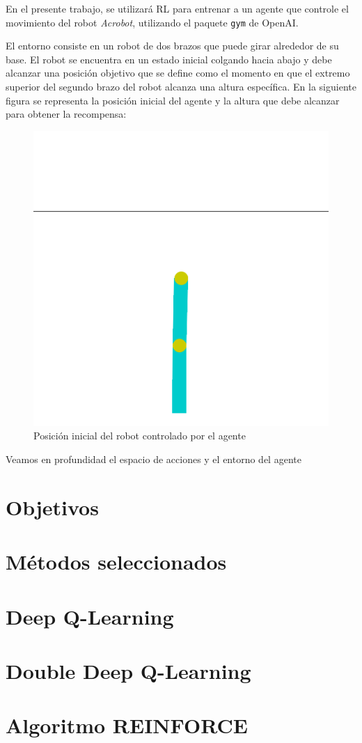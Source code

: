 \documentclass[12pt]{article}
\begin{document}
	En el presente trabajo, se utilizará RL para entrenar a un agente que controle el movimiento del robot \textit{Acrobot}, utilizando el paquete \texttt{gym} de OpenAI. 
	
	El entorno consiste en un robot de dos brazos que puede girar alrededor de su base. El robot se encuentra en un estado inicial colgando hacia abajo y debe alcanzar una posición objetivo que se define como el momento en que el extremo superior del segundo brazo del robot alcanza una altura específica. En la siguiente figura se representa la posición inicial del agente y la altura que debe alcanzar para obtener la recompensa:
	
	\begin{figure}[H]
		\centering
		\includegraphics[width = 0.5\linewidth]{Imagenes/acrobot0.png}
		\caption{Posición inicial del robot controlado por el agente}
		\label{f:acrobot0}
	\end{figure}
	
	Veamos en profundidad el espacio de acciones y el entorno del agente
	
	\section{Objetivos}
	
	\section{Métodos seleccionados}
	
	\section{Deep Q-Learning}
	
	\section{Double Deep Q-Learning}
	
	\section{Algoritmo REINFORCE}
	
\end{document}
